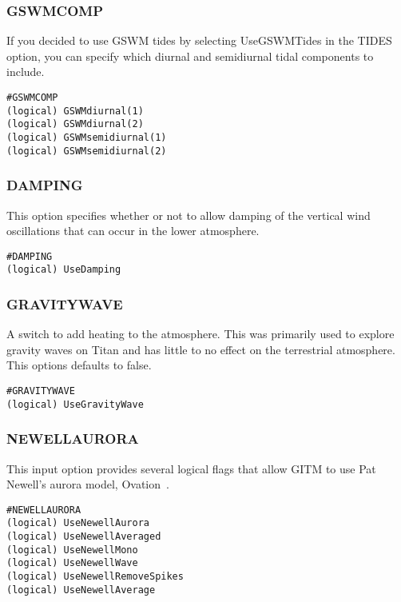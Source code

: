 \subsubsection{GSWMCOMP}
\label{gswmcomp.sec}

If you decided to use GSWM tides by selecting UseGSWMTides in the TIDES option, you can specify which diurnal and semidiurnal tidal components to include.

\begin{verbatim}
#GSWMCOMP
(logical) GSWMdiurnal(1)        
(logical) GSWMdiurnal(2)       
(logical) GSWMsemidiurnal(1)    
(logical) GSWMsemidiurnal(2)    
\end{verbatim}

\subsubsection{DAMPING}
\label{damping.sec}

This option specifies whether or not to allow damping of the vertical wind oscillations that can occur in the lower atmosphere.

\begin{verbatim}
#DAMPING
(logical) UseDamping        
\end{verbatim}

\subsubsection{GRAVITYWAVE}
\label{gravitywave.sec}
A switch to add heating to the atmosphere.  This was primarily used to explore gravity waves on Titan and has little to no effect on the terrestrial atmosphere.  This options defaults to false.

\begin{verbatim}
#GRAVITYWAVE
(logical) UseGravityWave
\end{verbatim}

\subsubsection{NEWELLAURORA}
\label{newellaurora.sec}

This input option provides several logical flags that allow GITM to use Pat Newell's aurora model, Ovation~\citep{Newell:2002ov}.

\begin{verbatim}
#NEWELLAURORA
(logical) UseNewellAurora   
(logical) UseNewellAveraged 
(logical) UseNewellMono 
(logical) UseNewellWave
(logical) UseNewellRemoveSpikes 
(logical) UseNewellAverage  
\end{verbatim}

